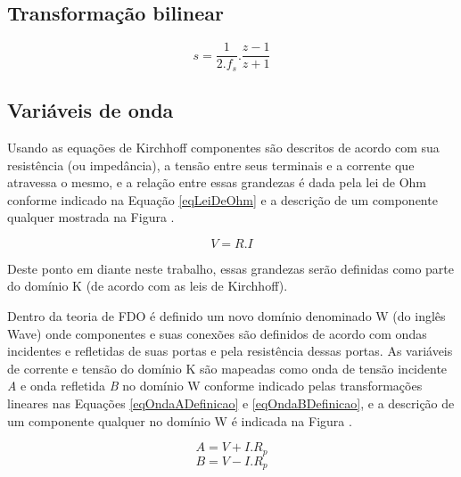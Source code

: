 	\subsection{Transformação bilinear}
	
	\begin{equation}
		\label{eqTransformacaoBilinear}
		s = \frac{1}{2.f_s}.\frac{z-1}{z+1}
	\end{equation}
	
	\subsection{Variáveis de onda}
	
	Usando as equações de Kirchhoff componentes são descritos de acordo com sua resistência (ou impedância), a tensão entre seus terminais e a corrente que atravessa o mesmo, e a relação entre essas grandezas é dada pela lei de Ohm conforme indicado na Equação \ref{eqLeiDeOhm} e a descrição de um componente qualquer mostrada na Figura .
	
	\begin{equation}
	\label{eqLeiDeOhm}
		V = R . I
	\end{equation} 
	
	Deste ponto em diante neste trabalho, essas grandezas serão definidas como parte do domínio K (de acordo com as leis de Kirchhoff). 
	
	\cite{Fettweis1986}	Dentro da teoria de FDO é definido um novo domínio denominado W (do inglês Wave) onde componentes e suas conexões são definidos de acordo com ondas incidentes e refletidas de suas portas e pela resistência dessas portas. As variáveis de corrente e tensão do domínio K são mapeadas como onda de tensão incidente \textit{A} e onda refletida \textit{B} no domínio W conforme indicado pelas transformações lineares nas Equações \ref{eqOndaADefinicao} e \ref{eqOndaBDefinicao}, e a descrição de um componente qualquer no domínio W é indicada na Figura .
	
	\begin{equation}
	\label{eqOndaADefinicao}
		A = V + I . R_p
	\end{equation}
	\begin{equation}
	\label{eqOndaBDefinicao}
		B = V - I . R_p
	\end{equation}
	
